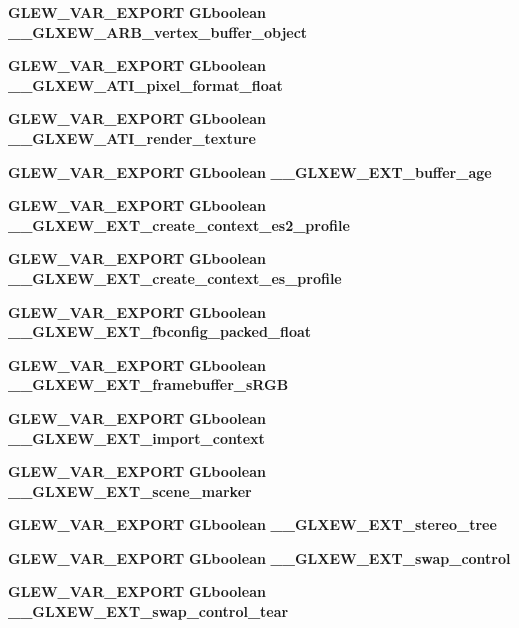 \begin{DoxyCompactItemize}
\item 
{\bf G\+L\+E\+W\+\_\+\+V\+A\+R\+\_\+\+E\+X\+P\+O\+RT} {\bf G\+Lboolean} {\bf \+\_\+\+\_\+\+G\+L\+X\+E\+W\+\_\+\+A\+R\+B\+\_\+vertex\+\_\+buffer\+\_\+object}
\item 
{\bf G\+L\+E\+W\+\_\+\+V\+A\+R\+\_\+\+E\+X\+P\+O\+RT} {\bf G\+Lboolean} {\bf \+\_\+\+\_\+\+G\+L\+X\+E\+W\+\_\+\+A\+T\+I\+\_\+pixel\+\_\+format\+\_\+float}
\item 
{\bf G\+L\+E\+W\+\_\+\+V\+A\+R\+\_\+\+E\+X\+P\+O\+RT} {\bf G\+Lboolean} {\bf \+\_\+\+\_\+\+G\+L\+X\+E\+W\+\_\+\+A\+T\+I\+\_\+render\+\_\+texture}
\item 
{\bf G\+L\+E\+W\+\_\+\+V\+A\+R\+\_\+\+E\+X\+P\+O\+RT} {\bf G\+Lboolean} {\bf \+\_\+\+\_\+\+G\+L\+X\+E\+W\+\_\+\+E\+X\+T\+\_\+buffer\+\_\+age}
\item 
{\bf G\+L\+E\+W\+\_\+\+V\+A\+R\+\_\+\+E\+X\+P\+O\+RT} {\bf G\+Lboolean} {\bf \+\_\+\+\_\+\+G\+L\+X\+E\+W\+\_\+\+E\+X\+T\+\_\+create\+\_\+context\+\_\+es2\+\_\+profile}
\item 
{\bf G\+L\+E\+W\+\_\+\+V\+A\+R\+\_\+\+E\+X\+P\+O\+RT} {\bf G\+Lboolean} {\bf \+\_\+\+\_\+\+G\+L\+X\+E\+W\+\_\+\+E\+X\+T\+\_\+create\+\_\+context\+\_\+es\+\_\+profile}
\item 
{\bf G\+L\+E\+W\+\_\+\+V\+A\+R\+\_\+\+E\+X\+P\+O\+RT} {\bf G\+Lboolean} {\bf \+\_\+\+\_\+\+G\+L\+X\+E\+W\+\_\+\+E\+X\+T\+\_\+fbconfig\+\_\+packed\+\_\+float}
\item 
{\bf G\+L\+E\+W\+\_\+\+V\+A\+R\+\_\+\+E\+X\+P\+O\+RT} {\bf G\+Lboolean} {\bf \+\_\+\+\_\+\+G\+L\+X\+E\+W\+\_\+\+E\+X\+T\+\_\+framebuffer\+\_\+s\+R\+GB}
\item 
{\bf G\+L\+E\+W\+\_\+\+V\+A\+R\+\_\+\+E\+X\+P\+O\+RT} {\bf G\+Lboolean} {\bf \+\_\+\+\_\+\+G\+L\+X\+E\+W\+\_\+\+E\+X\+T\+\_\+import\+\_\+context}
\item 
{\bf G\+L\+E\+W\+\_\+\+V\+A\+R\+\_\+\+E\+X\+P\+O\+RT} {\bf G\+Lboolean} {\bf \+\_\+\+\_\+\+G\+L\+X\+E\+W\+\_\+\+E\+X\+T\+\_\+scene\+\_\+marker}
\item 
{\bf G\+L\+E\+W\+\_\+\+V\+A\+R\+\_\+\+E\+X\+P\+O\+RT} {\bf G\+Lboolean} {\bf \+\_\+\+\_\+\+G\+L\+X\+E\+W\+\_\+\+E\+X\+T\+\_\+stereo\+\_\+tree}
\item 
{\bf G\+L\+E\+W\+\_\+\+V\+A\+R\+\_\+\+E\+X\+P\+O\+RT} {\bf G\+Lboolean} {\bf \+\_\+\+\_\+\+G\+L\+X\+E\+W\+\_\+\+E\+X\+T\+\_\+swap\+\_\+control}
\item 
{\bf G\+L\+E\+W\+\_\+\+V\+A\+R\+\_\+\+E\+X\+P\+O\+RT} {\bf G\+Lboolean} {\bf \+\_\+\+\_\+\+G\+L\+X\+E\+W\+\_\+\+E\+X\+T\+\_\+swap\+\_\+control\+\_\+tear}
\item 

\end{DoxyCompactItemize}
